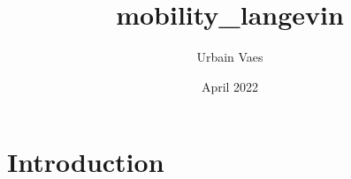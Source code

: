 \documentclass{article}
\title{mobility_langevin}
\author{Urbain Vaes}
\date{April 2022}
\begin{document}
\maketitle

\section{Introduction}
\end{document}
